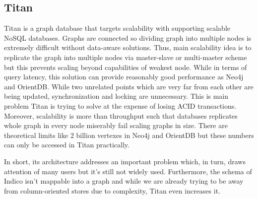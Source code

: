 \subsection{Titan}

Titan is a graph database that targets scalability with supporting scalable NoSQL databases. Graphs are connected so dividing graph into multiple nodes is extremely difficult without data-aware solutions. Thus, main scalability idea is to replicate the graph into multiple nodes via master-slave or multi-master scheme but this prevents scaling beyond capabilities of weakest node. While in terms of query latency, this solution can provide reasonably good performance as Neo4j and OrientDB. While two unrelated points which are very far from each other are being updated, synchronization and locking are unnecessary. This is main problem Titan is trying to solve at the expense of losing ACID transactions. Moreover, scalability is more than throughput such that databases replicates whole graph in every node miserably fail scaling graphs in size. There are theoretical limits like 2 billion vertexes in Neo4j and OrientDB but these numbers can only be accessed in Titan practically.

In short, its architecture addresses an important problem which, in turn, draws attention of many users but it's still not widely used. Furthermore, the schema of Indico isn't mappable into a graph and while we are already trying to be away from column-oriented stores due to complexity, Titan even increases it.

